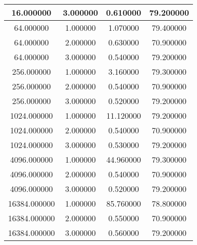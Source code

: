 \documentclass[12pt]{article}
\begin{document}
\begin{enumerate}[label=\alph*.]
\begin{longtable}{| c | c | c | c |}
		16.000000 & 3.000000 & 0.610000 & 79.200000 \\
		\hline
		64.000000 & 1.000000 & 1.070000 & 79.400000 \\
		\hline
		64.000000 & 2.000000 & 0.630000 & 70.900000 \\
		\hline
		64.000000 & 3.000000 & 0.540000 & 79.200000 \\
		\hline
		256.000000 & 1.000000 & 3.160000 & 79.300000 \\
		\hline
		256.000000 & 2.000000 & 0.540000 & 70.900000 \\
		\hline
		256.000000 & 3.000000 & 0.520000 & 79.200000 \\
		\hline
		1024.000000 & 1.000000 & 11.120000 & 79.200000 \\
		\hline
		1024.000000 & 2.000000 & 0.540000 & 70.900000 \\
		\hline
		1024.000000 & 3.000000 & 0.530000 & 79.200000 \\
		\hline
		4096.000000 & 1.000000 & 44.960000 & 79.300000 \\
		\hline
		4096.000000 & 2.000000 & 0.540000 & 70.900000 \\
		\hline
		4096.000000 & 3.000000 & 0.520000 & 79.200000 \\
		\hline
		16384.000000 & 1.000000 & 85.760000 & 78.800000 \\
		\hline
		16384.000000 & 2.000000 & 0.550000 & 70.900000 \\
		\hline
		16384.000000 & 3.000000 & 0.560000 & 79.200000 \\
		\hline
	\end{longtable}


\end{enumerate}
\end{document}
